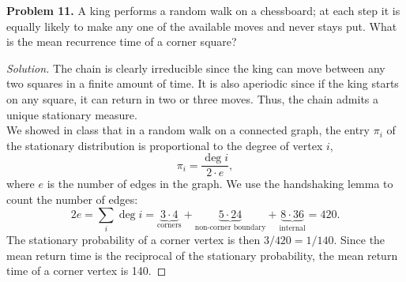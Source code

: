 \documentclass[11pt,letterpaper]{report}
\newenvironment{solution}
{\begin{proof}[Solution]}
{\end{proof}}
\begin{document}
\noindent\textbf{Problem 11. }
A king performs a random walk on a chessboard; at each step it is equally likely to make any one of the available moves and never stays put. What is the mean recurrence time of a corner square?
\begin{solution}
	The chain is clearly irreducible since the king can move between any two squares in a finite amount of time. It is also aperiodic since if the king starts on any square, it can return in two or three moves. Thus, the chain admits a unique stationary measure.\\

	\noindent We showed in class that in a random walk on a connected graph, the entry $\pi_i$ of the stationary distribution is proportional to the degree of vertex $i$,
	\[
	\pi_i = \frac{\deg i}{2\cdot e},
	\]
	where $e$ is the number of edges in the graph. We use the handshaking lemma to count the number of edges:
	\[
	2e = \sum_{i}\deg i = \underbrace{3\cdot 4}_{\text{corners}} + \underbrace{5\cdot 24}_{\text{non-corner boundary}} + \underbrace{8\cdot 36}_{\text{internal}} = 420.
	\]
	The stationary probability of a corner vertex is then $3/420 = 1/140$. Since the mean return time is the reciprocal of the stationary probability, the mean return time of a corner vertex is 140.
\end{solution}
\end{document}
